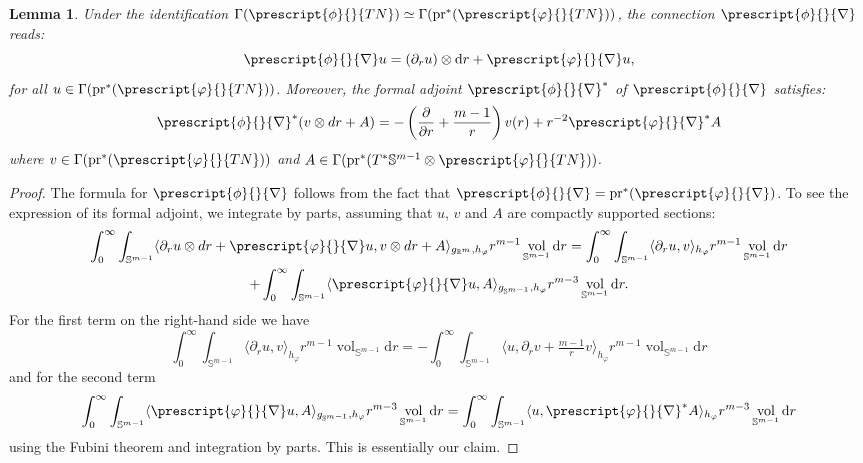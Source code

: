 \documentclass{article}
\numberwithin{equation}{section}        %
\theoremstyle{bfnote}
\newtheorem{lem}[thm]{Lemma}                %
\theoremstyle{definition}
\theoremstyle{bfremark}
\newcommand{\R}{\mathbb{R}}                 %
\newcommand{\Sp}{\mathbb{S}}                %
\newcommand{\pr}{\mathrm{pr}}               %
\newcommand{\diff}{\mathrm{d}}                      %
\DeclareMathOperator{\vol}{vol}                 %
\begin{document}
\begin{lem}
    Under the identification $\Gamma(\prescript{\phi}{}{TN}) \simeq  \Gamma(\pr^* (\prescript{\varphi}{}{TN}))$, the connection $\prescript{\phi}{}{\nabla}$ reads:
    \begin{equation*}
        \prescript{\phi}{}{\nabla} u = (\partial_r u ) \otimes \diff r + \prescript{\varphi}{}{\nabla} u ,
    \end{equation*}
    for all $u \in \Gamma(\pr^*(\prescript{\varphi}{}{TN}))$. Moreover, the formal adjoint $\prescript{\phi}{}{\nabla}^*$ of $\prescript{\phi}{}{\nabla}$ satisfies:
    \begin{equation*}
        \prescript{\phi}{}{\nabla}^* (v \otimes dr + A) = - \left( \frac{\partial}{\partial r} + \frac{m-1}{r} \right) v(r) + r^{-2} \prescript{\varphi}{}{\nabla}^* A
    \end{equation*}
    where $v \in \Gamma(\pr^*(\prescript{\varphi}{}{TN}))$ and $A \in \Gamma(\pr^*(T^* \Sp^{m-1} \otimes \prescript{\varphi}{}{TN}))$.
\end{lem}

\begin{proof}
    The formula for $\prescript{\phi}{}{\nabla}$ follows from the fact that $\prescript{\phi}{}{\nabla} = \pr^*(\prescript{\varphi}{}{\nabla})$. To see the expression of its formal adjoint,  we integrate by parts, assuming that $u$, $v$ and $A$ are compactly supported sections:
    \begin{multline*}
        \int_0^\infty \int_{\Sp^{m-1}} \langle \partial_r u \otimes dr + \prescript{\varphi}{}{\nabla} u , v \otimes dr + A \rangle_{g_{\R^m},h_\varphi} r^{m-1} \vol_{\Sp^{m-1}} \diff  r = \int_0^\infty \int_{\Sp^{m-1}} \langle \partial_r u , v \rangle_{h_\varphi} r^{m-1} \vol_{\Sp^{m-1}} \diff  r  \\ + \int_0^\infty \int_{\Sp^{m-1}} \langle \prescript{\varphi}{}{\nabla} u, A \rangle_{g_{\Sp^{m-1}},h_\varphi} r^{m-3} \vol_{\Sp^{m-1}} \diff  r .
    \end{multline*}
    For the first term on the right-hand side we have
    \begin{equation*}
        \int_0^\infty \int_{\Sp^{m-1}} \langle \partial_r u , v \rangle_{h_\varphi} r^{m-1} \vol_{\Sp^{m-1}} \diff  r = - \int_0^\infty \int_{\Sp^{m-1}} \langle u, \partial_r v + \tfrac{m-1}{r} v \rangle_{h_\varphi} r^{m-1} \vol_{\Sp^{m-1}} \diff  r
    \end{equation*}
    and for the second term 
    \begin{equation*}
        \int_0^\infty \int_{\Sp^{m-1}} \langle \prescript{\varphi}{}{\nabla} u, A \rangle_{g_{\Sp^{m-1}},h_\varphi} r^{m-3} \vol_{\Sp^{m-1}} \diff  r = \int_0^\infty \int_{\Sp^{m-1}} \langle u, \prescript{\varphi}{}{\nabla}^* A \rangle_{h_\varphi} r^{m-3} \vol_{\Sp^{m-1}} \diff  r
    \end{equation*}
    using the Fubini theorem and integration by parts. This is essentially our claim.
\end{proof}
\end{document}
